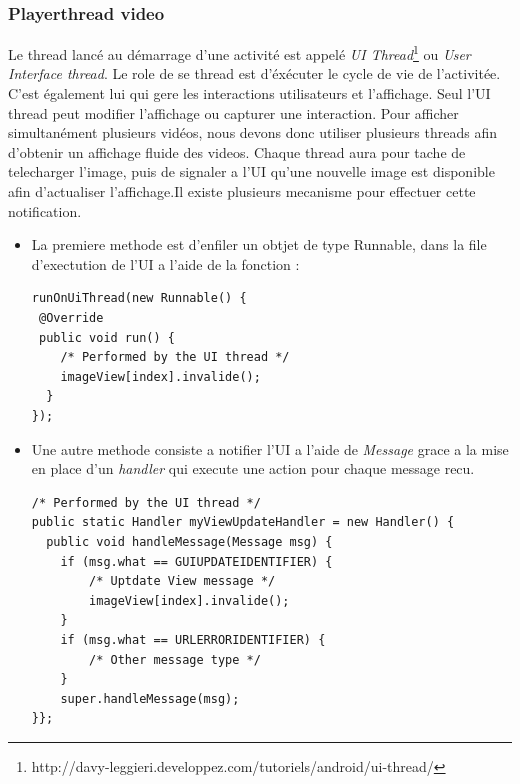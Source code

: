 \subsubsection{Playerthread video}
Le thread lancé au démarrage d'une activité est appelé \textit{UI Thread}\footnote{\label{UIThread}
http://davy-leggieri.developpez.com/tutoriels/android/ui-thread/} ou
\textit{User Interface thread}. Le role de se thread est d'éxécuter le cycle de
vie de l'activitée. C'est également lui qui gere les interactions
utilisateurs et l'affichage. Seul l'UI thread peut modifier l'affichage
ou capturer une interaction.\newline 
\indent Pour afficher simultanément plusieurs vidéos, nous devons donc utiliser
plusieurs threads afin d'obtenir un affichage fluide des videos.\newline
Chaque thread aura pour tache de telecharger l'image, puis de signaler a l'UI
qu'une nouvelle image est disponible afin d'actualiser
l'affichage.\newline\newline\indent Il existe plusieurs mecanisme pour effectuer
cette notification.\newline
\begin{itemize}
  \item La premiere methode est d'enfiler un obtjet de type
  Runnable, dans la file d'exectution de l'UI a l'aide de la
  fonction : \newline
  \begin{lstlisting}[caption={Example of use runOnUiThread}]
 runOnUiThread(new Runnable() {
 @Override
 public void run() {
	/* Performed by the UI thread */
	imageView[index].invalide();
  }
});  
  \end{lstlisting}
\item Une autre methode consiste a notifier l'UI a l'aide de
\textit{Message} grace a la mise en place d'un \textit{handler} qui
execute une action pour chaque message recu.\newline
\begin{lstlisting}[caption={Example of message handler}] 
/* Performed by the UI thread */
public static Handler myViewUpdateHandler = new Handler() {
  public void handleMessage(Message msg) {
	if (msg.what == GUIUPDATEIDENTIFIER) {
		/* Uptdate View message */
		imageView[index].invalide();
	}
	if (msg.what == URLERRORIDENTIFIER) {
		/* Other message type */
	}
	super.handleMessage(msg);
}};    
\end{lstlisting}    
\end{itemize}
